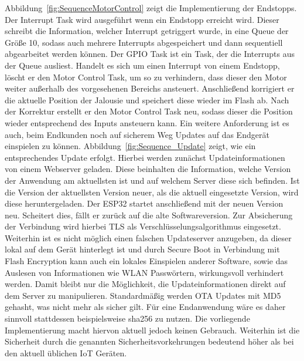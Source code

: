 Abbildung~\ref{fig:SequenceMotorControl} zeigt die Implementierung der Endstopps. Der Interrupt Task wird ausgeführt wenn ein Endstopp erreicht wird. Dieser schreibt die Information, welcher Interrupt getriggert wurde, in eine Queue der Größe 10, sodass auch mehrere Interrupts abgespeichert und dann sequentiell abgearbeitet werden können. Der GPIO Task ist ein Task, der die Interrupts aus der Queue ausliest. Handelt es sich um einen Interrupt von einem Endstopp, löscht er den Motor Control Task, um so zu verhindern, dass dieser den Motor weiter außerhalb des vorgesehenen Bereichs ansteuert. Anschließend korrigiert er die aktuelle Position der Jalousie und speichert diese wieder im Flash ab. Nach der Korrektur erstellt er den Motor Control Task neu, sodass dieser die Position wieder entsprechend des Inputs ansteuern kann. Ein weitere Anforderung ist es auch, beim Endkunden noch auf sicherem Weg Updates auf das Endgerät einspielen zu können. Abbildung~\ref{fig:Sequence_Update} zeigt, wie ein entsprechendes Update erfolgt. Hierbei werden zunächst Updateinformationen von einem Webserver geladen. Diese beinhalten die Information, welche Version der Anwendung am aktuellsten ist und auf welchem Server diese sich befinden. Ist die Version der aktuellsten Version neuer, als die aktuell eingesetzte Version, wird diese heruntergeladen. Der ESP32 startet anschließend mit der neuen Version neu. Scheitert dies, fällt er zurück auf die alte Softwareversion. Zur Absicherung der Verbindung wird hierbei TLS als Verschlüsselungsalgorithmus eingesetzt. Weiterhin ist es nicht möglich einen falschen Updateserver anzugeben, da dieser lokal auf dem Gerät hinterlegt ist und durch Secure Boot in Verbindung mit Flash Encryption kann auch ein lokales Einspielen anderer Software, sowie das Auslesen von Informationen wie WLAN Passwörtern, wirkungsvoll verhindert werden. Damit bleibt nur die Möglichkeit, die Updateinformationen direkt auf dem Server zu manipulieren. Standardmäßig werden OTA Updates mit MD5 gehasht, was nicht mehr als sicher gilt. Für eine Endanwendung wäre es daher sinnvoll stattdessen beispielsweise sha256 zu nutzen. Die vorliegende Implementierung macht hiervon aktuell jedoch keinen Gebrauch. Weiterhin ist die Sicherheit durch die genannten Sicherheitsvorkehrungen bedeutend höher als bei den aktuell üblichen IoT Geräten.


